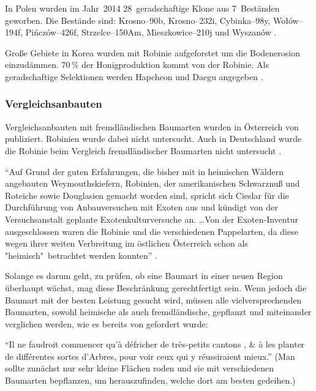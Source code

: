 \documentclass[twocolumn]{scrartcl}
\begin{document}
In Polen wurden im Jahr~2014 28~geradschaftige Klone aus 7~Beständen
geworben. Die Bestände sind: Krosno--90b, Krosno--232i, Cybinka--98y,
Wołów--194f, Pińczów--426f, Strzelce--150Am, Mieszkowice--210j und
Wyszanów \citep{wojda2015robiniePolen}.

Große Gebiete in Korea wurden mit Robinie aufgeforstet um die
Bodenerosion einzudämmen. 70\,\% der Honigproduktion kommt von der
Robinie. Als geradschaftige Selektionen werden Hapcheon und Daegu
angegeben \citep{lee2007robinieKorea}.

\subsubsection{Vergleichsanbauten}

Vergleichsanbauten mit fremdländischen Baumarten wurden in Österreich
von \citet{cieslar1901fremdlaendischeHolzarten} publiziert. Robinien
wurde dabei nicht untersucht. Auch in Deutschland wurde die Robinie
beim Vergleich fremdländischer Baumarten nicht untersucht
\citep{schwappach1901fremdlaendischeHolzarten}.

\enquote{Auf Grund der guten Erfahrungen, die bisher mit in heimischen
  Wäldern angebauten Weymouthskiefern, Robinien, der amerikanischen
  Schwarznuß und Roteiche sowie Douglasien gemacht worden sind,
  spricht sich Cieslar für die Durchführung von Anbauversuchen mit
  Exoten aus und kündigt von der Versuchsanstalt geplante
  Exotenkulturversuche an. \dots Von der Exoten-Inventur
  ausgeschlossen waren die Robinie und die verschiedenen Pappelarten,
  da diese wegen ihrer weiten Verbreitung im östlichen Österreich
  schon als "heimisch"\ betrachtet werden konnten}
\citep{rannert1979fremdlaendischeBaumarten}.

Solange es darum geht, zu prüfen, ob eine Baumart in einer neuen
Region überhaupt wächst, mag diese Beschränkung gerechtfertigt sein.
Wenn jedoch die Baumart mit der besten Leistung gesucht wird, müssen
alle vielversprechenden Baumarten, sowohl heimische als auch
fremdländische, gepflanzt und miteinander verglichen werden, wie es
bereits von \citet[S.~300]{reaumur1721ertragstafel} gefordert wurde:

\enquote{Il ne faudroit commencer qu’à défricher de très-petits cantons , \& à les planter de différentes sortes d'Arbres, pour voir ceux qui y réussiraient mieux.} (Man sollte zunächst nur sehr kleine Flächen roden und sie mit verschiedenen Baumarten bepflanzen, um herauszufinden, welche dort am besten gedeihen.)
\end{document}
